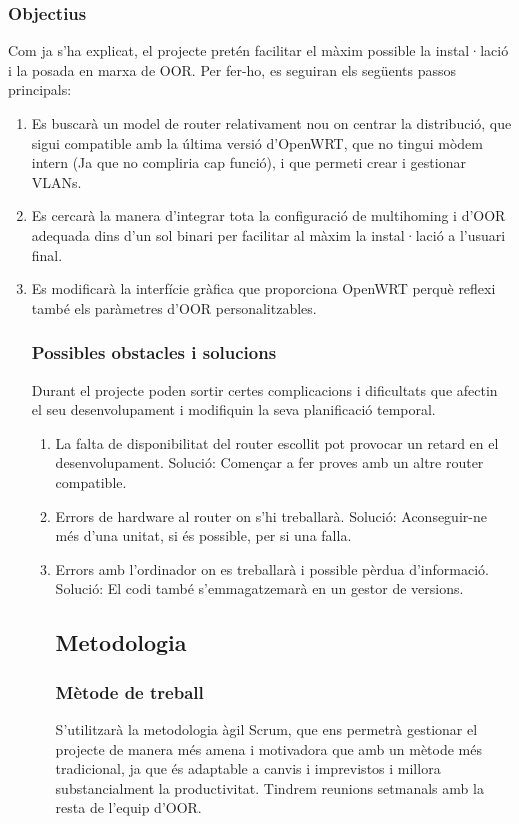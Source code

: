 \documentclass{article}
\begin{document}
\subsubsection{Objectius}
Com ja s’ha explicat, el projecte pretén facilitar el màxim possible la instal·lació i la posada en marxa de OOR. Per fer-ho, es seguiran els següents passos principals:
\begin{enumerate}
\item Es buscarà un model de router relativament nou on centrar la distribució, que sigui compatible amb la última versió d’OpenWRT, que no tingui mòdem intern (Ja que no compliria cap funció), i que permeti crear i gestionar VLANs.
\item Es cercarà la manera d’integrar tota la configuració de multihoming i d’OOR adequada dins d’un sol binari per facilitar al màxim la instal·lació a l’usuari final.
\item Es modificarà la interfície gràfica que proporciona OpenWRT perquè reflexi també els paràmetres d’OOR personalitzables.
\subsubsection{Possibles obstacles i solucions}
Durant el projecte poden sortir certes complicacions i dificultats que afectin el seu desenvolupament i modifiquin la seva planificació temporal.
\begin{enumerate}
\item La falta de disponibilitat del router escollit pot provocar un retard en el  desenvolupament. Solució: Començar a fer proves amb un altre router compatible.
\item Errors de hardware al router on s’hi treballarà. Solució: Aconseguir-ne més d’una unitat, si és possible, per si una falla.
\item Errors amb l’ordinador on es treballarà i possible pèrdua d’informació. Solució: El codi també s’emmagatzemarà en un gestor de versions.

\subsection{Metodologia}
\subsubsection{Mètode de treball}
S’utilitzarà la metodologia àgil Scrum, que ens permetrà gestionar el projecte de manera més amena i motivadora que amb un mètode més tradicional, ja que és adaptable a canvis i imprevistos i millora substancialment la productivitat. Tindrem reunions setmanals amb la resta de l’equip d’OOR.

\end{enumerate}
\end{enumerate}
\end{document}
